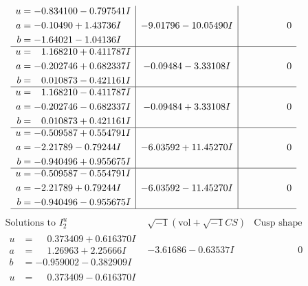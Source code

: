 \documentclass[1p]{elsarticle_modified}
\theoremstyle{definition}
\newcommand{\I}{\sqrt{-1}}
\begin{document}
$$\begin{array}{c|c|c}
\begin{aligned}
u &= -0.834100 - 0.797541 I \\
a &= -0.10490 + 1.43736 I \\
b &= -1.64021 - 1.04136 I\end{aligned}
 & -9.01796 - 10.05490 I & \phantom{-0.000000 } 0 \\ \hline\begin{aligned}
u &= \phantom{-}1.168210 + 0.411787 I \\
a &= -0.202746 + 0.682337 I \\
b &= \phantom{-}0.010873 - 0.421161 I\end{aligned}
 & -0.09484 - 3.33108 I & \phantom{-0.000000 } 0 \\ \hline\begin{aligned}
u &= \phantom{-}1.168210 - 0.411787 I \\
a &= -0.202746 - 0.682337 I \\
b &= \phantom{-}0.010873 + 0.421161 I\end{aligned}
 & -0.09484 + 3.33108 I & \phantom{-0.000000 } 0 \\ \hline\begin{aligned}
u &= -0.509587 + 0.554791 I \\
a &= -2.21789 - 0.79244 I \\
b &= -0.940496 + 0.955675 I\end{aligned}
 & -6.03592 + 11.45270 I & \phantom{-0.000000 } 0 \\ \hline\begin{aligned}
u &= -0.509587 - 0.554791 I \\
a &= -2.21789 + 0.79244 I \\
b &= -0.940496 - 0.955675 I\end{aligned}
 & -6.03592 - 11.45270 I & \phantom{-0.000000 } 0\\
 \hline 
 \end{array}$$\newpage$$\begin{array}{c|c|c}  
\text{Solutions to }I^u_{2}& \I (\text{vol} + \sqrt{-1}CS) & \text{Cusp shape}\\
 \hline 
\begin{aligned}
u &= \phantom{-}0.373409 + 0.616370 I \\
a &= \phantom{-}1.26963 + 2.25666 I \\
b &= -0.959002 - 0.382909 I\end{aligned}
 & -3.61686 - 0.63537 I & \phantom{-0.000000 } 0 \\ \hline\begin{aligned}
u &= \phantom{-}0.373409 - 0.616370 I \\

\end{aligned}
\end{array}$$
\end{document}
